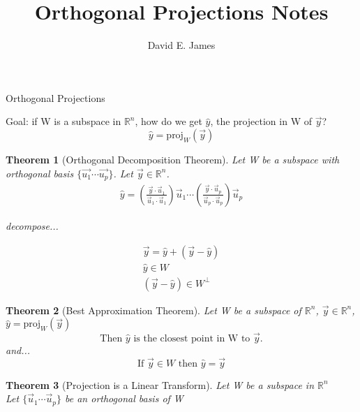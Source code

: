 \documentclass{article}
\title{Orthogonal Projections Notes}
\author{David E. James}
\theoremstyle{break}
\newtheorem*{theorem}{Theorem}
\begin{document}
\maketitle
Orthogonal Projections

\bigskip


\bigskip

Goal: if W is a subspace in $\mathbb{R}^n$, how do we get $\hat{y}$, the
projection in W of $\vec{y}$?
\begin{equation}
    \hat{y} = \text{proj}_W(\vec{y})
\end{equation}

\bigskip

\begin{theorem}[Orthogonal Decomposition Theorem]
Let W be a subspace with orthogonal basis $\{\vec{u_1} \dotsm \vec{u_p}\}$.
Let $\vec{y} \in \mathbb{R}^n$.
\begin{align}
    \hat{y} = \left(\frac{\vec{y} \cdot \vec{u}_1}{\vec{u}_1 \cdot \vec{u}_1}\right)\vec{u}_1 \dotsm \left(\frac{\vec{y} \cdot \vec{u}_p}{\vec{u}_p \cdot \vec{u}_p}\right)\vec{u}_p
\end{align}

decompose...

\begin{align}
    \vec{y} = \hat{y} + \left( \vec{y} - \hat{y} \right) \\
    \hat{y} \in W \\
    \left( \vec{y} - \hat{y} \right) \in W^{\perp}
\end{align}

\end{theorem}




\begin{theorem}[Best Approximation Theorem]
    Let W be a subspace of $\mathbb{R}^n$, $\vec{y} \in \mathbb{R}^n$, $\hat{y} = \text{proj}_W(\vec{y})$
    \bigskip
    \begin{equation}
        \text{Then } \hat{y} \text{ is the closest point in W to }\vec{y}.
    \end{equation}
    and...
    \begin{equation}
        \text{If } \vec{y} \in W \text{ then } \hat{y} = \vec{y}
    \end{equation}


\end{theorem}


\begin{theorem}[Projection is a Linear Transform]
Let W be a subspace in $\mathbb{R}^n$ \\
Let $\{\vec{u}_1 \dotsm \vec{u}_p \}$ be an orthogonal basis of W
\end{theorem}
\end{document}
